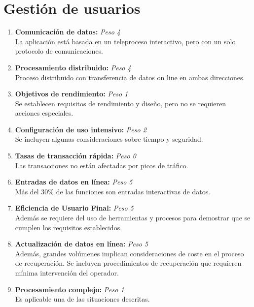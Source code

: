 \documentclass[11pt,a4paper,spanish,twoside]{book}
\begin{document}
\section{Gestión de usuarios}
\begin{enumerate}[{\bf 1.}]

\item {\bf Comunicación de datos:} \emph{Peso 4} \\ La aplicación está basada en
  un teleproceso interactivo, pero con un solo protocolo de comunicaciones.

\item {\bf Procesamiento distribuido:} \emph{Peso 4} \\ Proceso distribuido
  con transferencia de datos on line en ambas direcciones. 

\item {\bf Objetivos de rendimiento:} \emph{Peso 1} \\ Se establecen requisitos
  de rendimiento y diseño, pero no se requieren acciones especiales.

\item {\bf Configuración de uso intensivo:} \emph{Peso 2} \\ Se incluyen algunas
  consideraciones sobre tiempo y seguridad. 

\item {\bf Tasas de transacción rápida:} \emph{Peso 0} \\ Las transacciones no
  están afectadas por picos de tráfico. 

\item {\bf Entradas de datos en línea:} \emph{Peso 5} \\ Más del 30\% de las
  funciones son entradas interactivas de datos. 

\item {\bf Eficiencia de Usuario Final:} \emph{Peso 5} \\ Además se requiere del
  uso de herramientas y procesos para demostrar que se cumplen los requisitos
  establecidos.

\item {\bf Actualización de datos en línea:} \emph{Peso 5} \\ Además, grandes
  volúmenes implican consideraciones de coste en el proceso de
  recuperación. Se incluyen procedimientos de recuperación que requieren
  mínima intervención del operador. 

\item {\bf Procesamiento complejo:} \emph{Peso 1} \\ Es aplicable una de las
  situaciones descritas. 


\end{enumerate}
\end{document}
